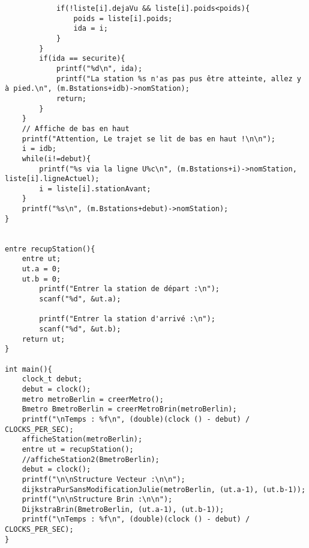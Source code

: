 \begin{verbatim}
			if(!liste[i].dejaVu && liste[i].poids<poids){
				poids = liste[i].poids;
				ida = i;
			}
		}	
		if(ida == securite){
			printf("%d\n", ida);
			printf("La station %s n'as pas pus être atteinte, allez y à pied.\n", (m.Bstations+idb)->nomStation);
			return;
		}
	}
	// Affiche de bas en haut
	printf("Attention, Le trajet se lit de bas en haut !\n\n");
	i = idb;
	while(i!=debut){
		printf("%s via la ligne U%c\n", (m.Bstations+i)->nomStation, liste[i].ligneActuel);
		i = liste[i].stationAvant;
	}
	printf("%s\n", (m.Bstations+debut)->nomStation);
}


entre recupStation(){
	entre ut;
	ut.a = 0;
	ut.b = 0;
		printf("Entrer la station de départ :\n");
		scanf("%d", &ut.a);

		printf("Entrer la station d'arrivé :\n");
		scanf("%d", &ut.b);
	return ut;
}

int main(){
	clock_t debut;
	debut = clock();
	metro metroBerlin = creerMetro();
	Bmetro BmetroBerlin = creerMetroBrin(metroBerlin);
	printf("\nTemps : %f\n", (double)(clock () - debut) / CLOCKS_PER_SEC);
	afficheStation(metroBerlin);
	entre ut = recupStation();
	//afficheStation2(BmetroBerlin);
	debut = clock();
	printf("\n\nStructure Vecteur :\n\n");
	dijkstraPurSansModificationJulie(metroBerlin, (ut.a-1), (ut.b-1));
	printf("\n\nStructure Brin :\n\n");
	DijkstraBrin(BmetroBerlin, (ut.a-1), (ut.b-1));
	printf("\nTemps : %f\n", (double)(clock () - debut) / CLOCKS_PER_SEC);
}

\end{verbatim}